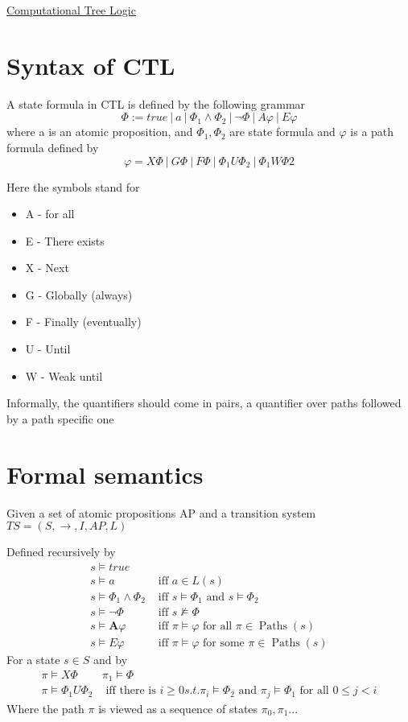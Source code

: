 \documentclass{article}[18pt]
\begin{document}
\begin{center}
\underline{\huge Computational Tree Logic}
\end{center}
\section{Syntax of CTL}
\begin{definition}
A state formula in CTL is defined by the following grammar
$$\Phi:=true \ | \ a \ | \ \Phi_1\land\Phi_2 \ | \ \lnot \Phi \ | \  A\varphi \ | \ E\varphi $$
where a is an atomic proposition, and $\Phi_1,\Phi_2$ are state formula and $\varphi$ is a path formula defined by
$$\varphi=X\Phi \ | \ G\Phi \ | \ F\Phi \ | \ \Phi_1 U \Phi_2 \ | \ \Phi_1 W \Phi 2$$
\end{definition}

Here the symbols stand for
\begin{itemize}
	\item A - for all
	\item E - There exists
	\item X - Next
	\item G - Globally (always)
	\item F - Finally (eventually)
	\item U - Until
	\item W - Weak until
\end{itemize}
Informally, the quantifiers should come in pairs, a quantifier over paths followed by a path specific one

\section{Formal semantics}
Given a set of atomic propositions AP and a transition system $TS=(S,\rightarrow,I,AP,L)$
\begin{definition}
Defined recursively by
$$\begin{array}{ll}
s \models t r u e & \\
s \models a & \text { iff } a \in L(s) \\
s \models \Phi_{1} \wedge \Phi_{2} & \text { iff } s\models\Phi_{1} \text { and } s \models \Phi_{2} \\
s \models \neg \Phi & \text { iff } s \not\models \Phi \\
s \models \mathbf{A} \varphi & \text { iff } \pi\models\varphi \text { for all } \pi \in \operatorname{Paths}(s) \\
s\models E\varphi & \text{ iff } \pi \models \varphi  \text { for some } \pi \in \operatorname{Paths}(s)
\end{array}$$
For a state $s\in S$ and by
$$\begin{array}{ll}
\pi \models X \Phi & \pi_1\models\Phi\\
\pi\models \Phi_1U\Phi_2 & \text{ iff there is } i\geqslant 0 s.t. \pi_i\models\Phi_2 \text{ and } \pi_j \models \Phi_1 \text{ for all } 0\leqslant j <i
\end{array}$$
Where the path $\pi$ is viewed as a sequence of states $\pi_0,\pi_1...$
\end{definition}
\end{document}
